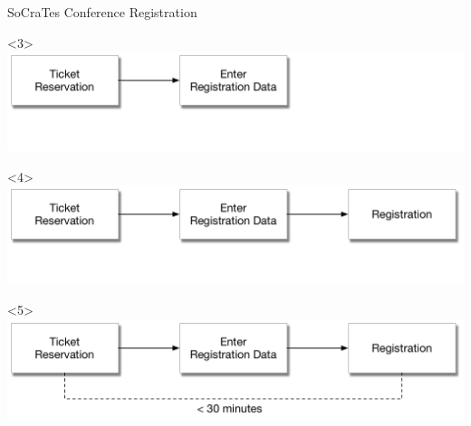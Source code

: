 \begin{frame}[fragile]{SoCraTes Conference Registration}
\begin{onlyenv}<3>
\includegraphics[width=\textwidth]{../Registration2.pdf}
\end{onlyenv}

\begin{onlyenv}<4>
\includegraphics[width=\textwidth]{../Registration3.pdf}
\end{onlyenv}

\begin{onlyenv}<5>
\includegraphics[width=\textwidth]{../Registration4.pdf}
\end{onlyenv}

\end{frame}

